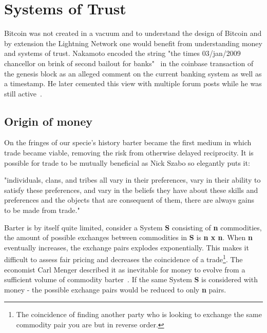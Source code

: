 \chapter{Systems of Trust}
\label{sec:macroeconomics}

Bitcoin was not created in a vacuum and to understand the design of Bitcoin and by extension the Lightning Network one would
benefit from understanding money and systems of trust. Nakamoto encoded the string "the times 03/jan/2009 chancellor on brink of second bailout for banks"~\cite{repository:bitcoin:sourceforge, bitcoin:genesis:coinbase} in the coinbase transaction of the genesis block as an alleged comment on the current banking system as well as a timestamp. He later cemented this view with multiple forum posts while he was still active~\cite{nakamoto:post:deflation, nakamoto:govern:print}.

\section{Origin of money}

On the fringes of our specie's history barter became the first medium in which trade became viable, removing the risk from otherwise delayed reciprocity. It is possible for trade to be mutually beneficial as Nick Szabo so elegantly puts it:

\begin{displayquote}

"individuals, clans, and tribes all vary in their preferences, vary in their ability to satisfy these preferences, and vary in the beliefs they have about these skills and preferences and the objects that are consequent of them, there are always gains to be made from trade."~\cite{szabo:shelling:out}

\end{displayquote}

Barter is by itself quite limited, consider a System \textbf{S}
consisting of \textbf{n} commodities, the amount of possible exchanges between commodities in \textbf{S} is \textbf{n x n}. When \textbf{n} eventually increases, the exchange pairs explodes exponentially. This makes it difficult to assess fair pricing and decreases the coincidence of a trade\footnote{The coincidence of finding another party who is looking to exchange the same commodity pair you are but in reverse order.}. The economist Carl Menger described it as inevitable for money to evolve from a sufficient volume of commodity barter~\cite{menger:origins:money}. If the same System \textbf{S} is considered with money - the possible exchange pairs would be reduced to only \textbf{n} pairs. 

